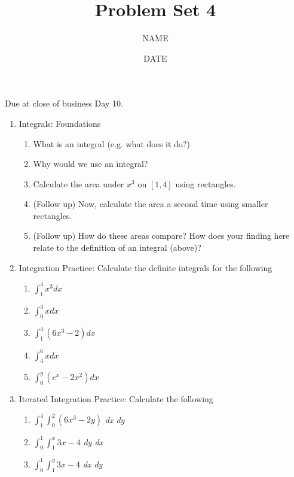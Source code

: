 \documentclass[12pt,thmsa]{article}
\title{Problem Set 4}
\author{NAME}
\date{DATE}
\begin{document}
\maketitle


Due at close of business Day 10. 

\begin{enumerate}
\item Integrals: Foundations
\begin{enumerate}

\item What is an integral (e.g. what does it do?)
\item Why would we use an integral?
\item Calculate the area under $x^3$ on $[1,4]$ using rectangles. 
\item (Follow up) Now, calculate the area a second time using smaller rectangles. 
\item (Follow up) How do these areas compare? How does your finding here relate to the definition of an integral (above)?
\end{enumerate}


\item Integration Practice: Calculate the definite integrals for the following
\begin{enumerate}
\item $\int_1^4 x^3 dx$
\item $\int_0^3 x dx$
\item $\int_1^4 (6x^3-2) dx$
\item $\int_4^6 x dx$
\item $\int_0^y (e^x-2x^2)dx$
\end{enumerate}


\item Iterated Integration Practice: Calculate the following
\begin{enumerate}
\item $\int_1^4  \int_0^2 (6x^3-2y)$ \textit{dx dy}
\item $\int_0^1 \int_1^x 3x-4$ \textit{dy dx}
\item $\int_0^1 \int_1^y 3x-4$ \textit{dx dy}
\end{enumerate}


\end{enumerate}
\end{document}
